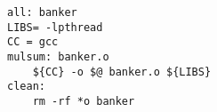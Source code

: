 \begin{lstlisting}
all: banker
LIBS= -lpthread
CC = gcc
mulsum: banker.o
	${CC} -o $@ banker.o ${LIBS}
clean:
	rm -rf *o banker
\end{lstlisting}